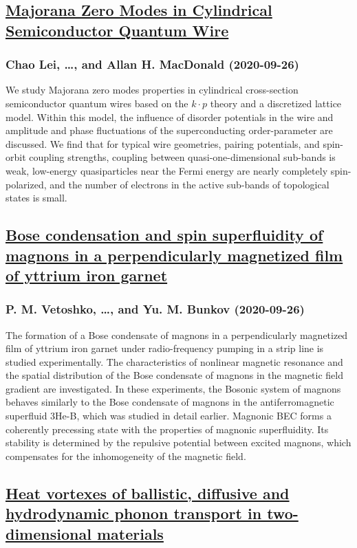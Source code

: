 \subsection*{\href{http://arxiv.org/abs/2009.12640v1}{Majorana Zero Modes in Cylindrical Semiconductor Quantum Wire}}
\subsubsection*{Chao Lei, \dots, and Allan H. MacDonald (2020-09-26)}
We study Majorana zero modes properties in cylindrical cross-section
semiconductor quantum wires based on the $k \cdot p$ theory and a discretized
lattice model. Within this model, the influence of disorder potentials in the
wire and amplitude and phase fluctuations of the superconducting
order-parameter are discussed. We find that for typical wire geometries,
pairing potentials, and spin-orbit coupling strengths, coupling between
quasi-one-dimensional sub-bands is weak, low-energy quasiparticles near the
Fermi energy are nearly completely spin-polarized, and the number of electrons
in the active sub-bands of topological states is small.

\subsection*{\href{http://arxiv.org/abs/2009.12595v1}{Bose condensation and spin superfluidity of magnons in a perpendicularly  magnetized film of yttrium iron garnet}}
\subsubsection*{P. M. Vetoshko, \dots, and Yu. M. Bunkov (2020-09-26)}
The formation of a Bose condensate of magnons in a perpendicularly magnetized
film of yttrium iron garnet under radio-frequency pumping in a strip line is
studied experimentally. The characteristics of nonlinear magnetic resonance and
the spatial distribution of the Bose condensate of magnons in the magnetic
field gradient are investigated. In these experiments, the Bosonic system of
magnons behaves similarly to the Bose condensate of magnons in the
antiferromagnetic superfluid 3He-B, which was studied in detail earlier.
Magnonic BEC forms a coherently precessing state with the properties of
magnonic superfluidity. Its stability is determined by the repulsive potential
between excited magnons, which compensates for the inhomogeneity of the
magnetic field.

\subsection*{\href{http://arxiv.org/abs/2009.12587v1}{Heat vortexes of ballistic, diffusive and hydrodynamic phonon transport  in two-dimensional materials}}
